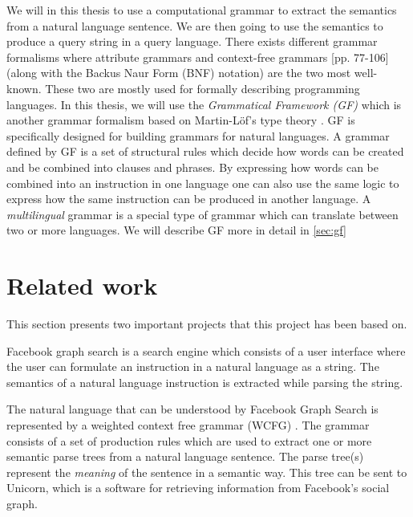 We will in this thesis to use a computational grammar to extract the semantics from a natural language sentence. We are then going to use the semantics to produce a query string in a query language.
\newline
\newline
There exists different grammar formalisms where attribute grammars \cite{knuth:1968} and context-free grammars \cite{Hopcroft:1990:IAT:574901}[pp. 77-106] (along with the Backus Naur Form (BNF) \cite{backus} notation) are the two most well-known. These two are mostly used for formally describing programming languages.
\newline
\newline
In this thesis, we will use the \emph{Grammatical Framework (GF)} which is another grammar formalism \cite{ranta:2004} based on Martin-Löf's type theory \cite{Martin-lof}. GF is specifically designed for building grammars for natural languages.
\newline
\newline
A grammar defined by GF is a set of structural rules which decide how words can be created and be combined into clauses and phrases. By expressing how words can be combined into an instruction in one language one can also use the same logic to express how the same instruction can be produced in another language. A \emph{multilingual} grammar is a special type of grammar which can translate between two or more languages. We will describe GF more in detail in \autoref{sec:gf}

\section{Related work}
This section presents two important projects that this project has been based on.

Facebook graph search \cite{unicorn} is a search engine which consists of a user interface where the user can formulate an instruction in a natural language as a string. The semantics of a natural language instruction is extracted while parsing the string.

The natural language that can be understood by Facebook Graph Search is represented by a weighted context free grammar (WCFG) \cite{li:2013}. The grammar consists of a set of production rules which are used to extract one or more semantic parse trees from a natural language sentence. The parse tree(s) represent the \emph{meaning} of the sentence in a semantic way. This tree can be sent to Unicorn, which is a software for retrieving information from Facebook's social graph. \cite{unicorn}

